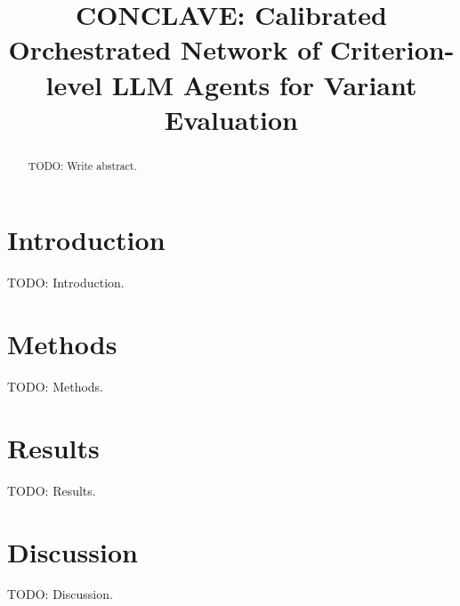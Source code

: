 \documentclass[12pt]{article}
\title{CONCLAVE: Calibrated Orchestrated Network of Criterion-level LLM Agents for Variant Evaluation}
\author{}
\date{}
\begin{document}
\maketitle

\begin{abstract}
TODO: Write abstract.
\end{abstract}

\section{Introduction}
TODO: Introduction.

\section{Methods}
TODO: Methods.

\section{Results}
TODO: Results.

\section{Discussion}
TODO: Discussion.



\end{document}
